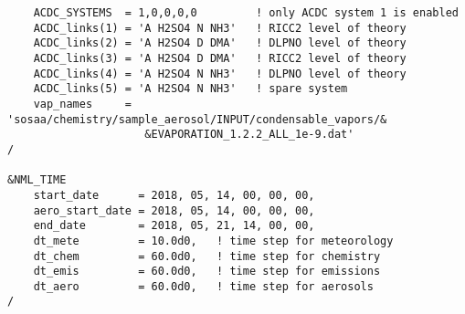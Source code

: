 \begin{verbatim}
    ACDC_SYSTEMS  = 1,0,0,0,0         ! only ACDC system 1 is enabled
    ACDC_links(1) = 'A H2SO4 N NH3'   ! RICC2 level of theory
    ACDC_links(2) = 'A H2SO4 D DMA'   ! DLPNO level of theory
    ACDC_links(3) = 'A H2SO4 D DMA'   ! RICC2 level of theory
    ACDC_links(4) = 'A H2SO4 N NH3'   ! DLPNO level of theory
    ACDC_links(5) = 'A H2SO4 N NH3'   ! spare system
    vap_names     = 'sosaa/chemistry/sample_aerosol/INPUT/condensable_vapors/&
                     &EVAPORATION_1.2.2_ALL_1e-9.dat'
/

&NML_TIME
    start_date      = 2018, 05, 14, 00, 00, 00,
    aero_start_date = 2018, 05, 14, 00, 00, 00,
    end_date        = 2018, 05, 21, 14, 00, 00,
    dt_mete         = 10.0d0,   ! time step for meteorology
    dt_chem         = 60.0d0,   ! time step for chemistry
    dt_emis         = 60.0d0,   ! time step for emissions
    dt_aero         = 60.0d0,   ! time step for aerosols
/
\end{verbatim}

